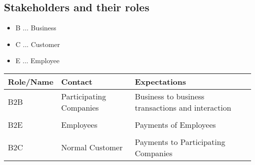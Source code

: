 \subsection{Stakeholders and their roles}\label{_stakeholders}

\begin{itemize}
	\item B ... Business
	\item C ... Customer
	\item E ... Employee	
\end{itemize}

\begin{longtable}[]{@{}lll@{}}
\toprule
\begin{minipage}[b]{0.18\columnwidth}\raggedright\strut
Role/Name\strut
\end{minipage} & \begin{minipage}[b]{0.37\columnwidth}\raggedright\strut
Contact\strut
\end{minipage} & \begin{minipage}[b]{0.37\columnwidth}\raggedright\strut
Expectations\strut
\end{minipage}\tabularnewline
\midrule
\endhead
\begin{minipage}[t]{0.18\columnwidth}B2B \end{minipage} &
\begin{minipage}[t]{0.37\columnwidth}Participating Companies \end{minipage} &
\begin{minipage}[t]{0.37\columnwidth}Business to business transactions and interaction\end{minipage}
\tabularnewline
\tabularnewline
\begin{minipage}[t]{0.18\columnwidth}B2E \end{minipage} &
\begin{minipage}[t]{0.37\columnwidth}Employees \end{minipage} &
\begin{minipage}[t]{0.37\columnwidth}Payments of Employees\end{minipage}
\tabularnewline
\tabularnewline
\begin{minipage}[t]{0.18\columnwidth}B2C \end{minipage} &
\begin{minipage}[t]{0.37\columnwidth}Normal Customer \end{minipage} &
\begin{minipage}[t]{0.37\columnwidth}Payments to Participating Companies\end{minipage}

\end{longtable}
